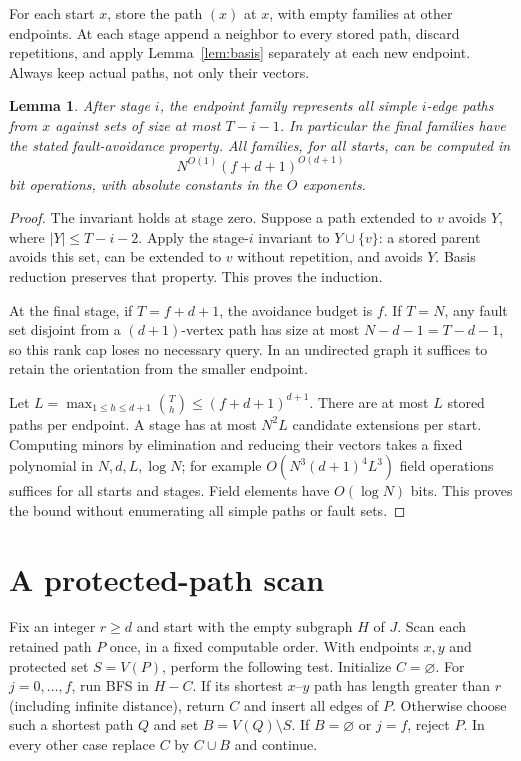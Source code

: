\documentclass[acmsmall,11pt,screen,nonacm]{acmart}
\newtheorem{lemma}[theorem]{Lemma}
\begin{document}
For each start $x$, store the path $(x)$ at $x$, with empty families at
other endpoints. At each stage append a neighbor to every stored path,
discard repetitions, and apply Lemma~\ref{lem:basis} separately at each
new endpoint. Always keep actual paths, not only their vectors.

\begin{lemma}\label{lem:paths}
After stage $i$, the endpoint family represents all simple $i$-edge paths
from $x$ against sets of size at most $T-i-1$. In particular the final
families have the stated fault-avoidance property. All families, for all
starts, can be computed in
\[
 N^{O(1)}(f+d+1)^{O(d+1)}
\]
bit operations, with absolute constants in the $O$ exponents.
\end{lemma}
\begin{proof}
The invariant holds at stage zero. Suppose a path extended to $v$ avoids
$Y$, where $|Y|\le T-i-2$. Apply the stage-$i$ invariant to
$Y\cup\{v\}$: a stored parent avoids this set, can be extended to $v$
without repetition, and avoids $Y$. Basis reduction preserves that
property. This proves the induction.

At the final stage, if $T=f+d+1$, the avoidance budget is $f$. If $T=N$,
any fault set disjoint from a $(d+1)$-vertex path has size at most
$N-d-1=T-d-1$, so this rank cap loses no necessary query. In an undirected
graph it suffices to retain the orientation from the smaller endpoint.

Let $L=\max_{1\le h\le d+1}\binom{T}{h}\le(f+d+1)^{d+1}$. There are at
most $L$ stored paths per endpoint. A stage has at most $N^2L$ candidate
extensions per start. Computing minors by elimination and reducing their
vectors takes a fixed polynomial in $N,d,L,\log N$; for example
$O(N^3(d+1)^4L^3)$ field operations suffices for all starts and stages.
Field elements have $O(\log N)$ bits. This proves the bound without
enumerating all simple paths or fault sets.
\end{proof}

\section{A protected-path scan}\label{sec:scan}

Fix an integer $r\ge d$ and start with the empty subgraph $H$ of $J$.
Scan each retained path $P$ once, in a fixed computable order. With endpoints
$x,y$ and protected set $S=V(P)$, perform the following test.
Initialize $C=\varnothing$. For $j=0,\ldots,f$, run BFS in $H-C$.
If its shortest $x$--$y$ path has length greater than $r$ (including
infinite distance), return $C$ and insert all edges of $P$.
Otherwise choose such a shortest path $Q$ and set $B=V(Q)\setminus S$.
If $B=\varnothing$ or $j=f$, reject $P$. In every other case replace
$C$ by $C\cup B$ and continue.
\end{document}
